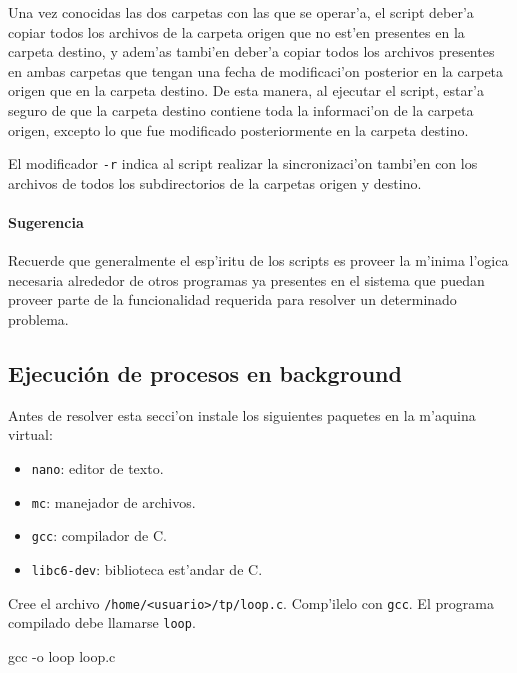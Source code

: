 Una vez conocidas las dos carpetas con las que se operar'a, el script deber'a copiar todos los archivos de la carpeta origen
que no est'en presentes en la carpeta destino, y adem'as tambi'en deber'a copiar todos los archivos presentes en ambas
carpetas que tengan una fecha de modificaci'on posterior en la carpeta origen que en la carpeta destino. De esta manera, al
ejecutar el script, estar'a seguro de que la carpeta destino contiene toda la informaci'on de la carpeta origen, excepto lo
que fue modificado posteriormente en la carpeta destino.

El modificador \texttt{-r} indica al script realizar la sincronizaci'on tambi'en con los archivos de todos los
subdirectorios de la carpetas origen y destino.


\paragraph{Sugerencia}

Recuerde que generalmente el esp'iritu de los scripts es proveer la m'inima l'ogica necesaria alrededor de otros programas
ya presentes en el sistema que puedan proveer parte de la funcionalidad requerida para resolver un determinado problema.

\subsection{Ejecuci\'on de procesos en background}

Antes de resolver esta secci'on instale los siguientes paquetes en la m'aquina virtual:

\begin{itemize}
\item \texttt{nano}: editor de texto.
\item \texttt{mc}: manejador de archivos.
\item \texttt{gcc}: compilador de C.
\item \texttt{libc6-dev}: biblioteca est'andar de C.
\end{itemize}

Cree el archivo \texttt{/home/<usuario>/tp/loop.c}. Comp'ilelo con \texttt{gcc}. El programa compilado debe llamarse
\texttt{loop}.

\begin{envRespuesta}
gcc -o loop loop.c
\end{envRespuesta}

